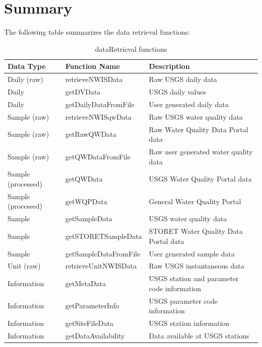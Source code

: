 \documentclass[a4paper,11pt]{article}\usepackage[]{graphicx}\usepackage[]{color}
\begin{document}
\clearpage

\section{Summary}

The following table summarizes the data retrieval functions:

\begin{table}[!ht]
\begin{minipage}{\linewidth}
\begin{center}
\caption{dataRetrieval functions} 
\begin{tabular}{lll}
  \hline
Data Type & Function Name & Description \\ 
  \hline
  Daily (raw) & retrieveNWISData & Raw USGS daily data \\
  Daily & getDVData & USGS daily values \\
  Daily & getDailyDataFromFile & User generated daily data \\
  Sample (raw) & retrieveNWISqwData & Raw USGS water quality data \\
  Sample (raw) & getRawQWData & Raw Water Quality Data Portal data \\
  Sample (raw) & getQWDataFromFile & Raw user generated water quality data \\
  Sample (processed) & getQWData & USGS Water Quality Portal data \\
  Sample (processed) & getWQPData & General Water Quality Portal\\
  Sample & getSampleData & USGS water quality data\\  
  Sample & getSTORETSampleData & STORET Water Quality Data Portal data \\
  Sample & getSampleDataFromFile & User generated sample data \\
  Unit (raw) & retrieveUnitNWISData & Raw USGS instantaneous data \\  
  Information & getMetaData & USGS station and parameter code information \\
  Information & getParameterInfo & USGS parameter code information \\
  Information & getSiteFileData & USGS station information \\
  Information & getDataAvailability & Data available at USGS stations \\
   \hline
\end{tabular}
\end{center}
\end{minipage}
\end{table}
\end{document}
